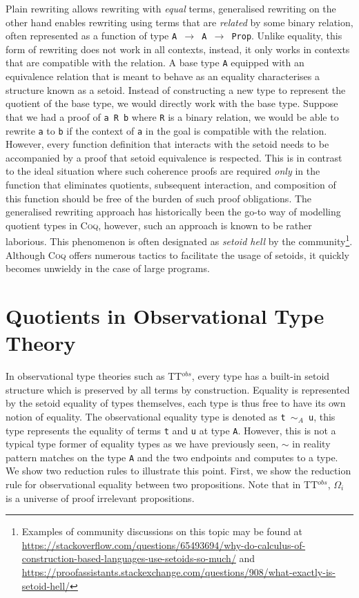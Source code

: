 \documentclass[12pt,twoside,maitrise]{dms}
\theoremstyle{definition}
\numberwithin{equation}{section}
\numberwithin{table}{chapter}
\numberwithin{figure}{chapter}
\newcommand\kw[1] {\textsf{#1}}
\newcommand\id[1] {\texttt{#1}}
\newcommand\fn[1] {\texttt{#1}}
\def\Coq{\textsc{Coq}\xspace}
\begin{document}
Plain rewriting allows rewriting with \emph{equal} terms, generalised
rewriting\cite{sozeau2009new, coq-gen-rewriting} on the other hand enables
rewriting using terms that are \emph{related} by some binary relation, often
represented as a function of type \fn{A $\rightarrow$ A $\rightarrow$
  \kw{Prop}}. Unlike equality, this form of rewriting does not work in all
contexts, instead, it only works in contexts that are compatible with the
relation. A base type \id{A} equipped with an equivalence relation that is meant
to behave as an equality characterises a structure known as a
setoid\cite{hofmann1995simple}. Instead of constructing a new type to represent
the quotient of the base type, we would directly work with the base type.
Suppose that we had a proof of \fn{a R b} where \id{R} is a binary relation, we
would be able to rewrite \id{a} to \id{b} if the context of \id{a} in the goal
is compatible with the relation. However, every function definition that
interacts with the setoid needs to be accompanied by a proof that setoid
equivalence is respected. This is in contrast to the ideal situation where such
coherence proofs are required \emph{only} in the function that eliminates
quotients, subsequent interaction, and composition of this function should be
free of the burden of such proof obligations. The generalised rewriting approach
has historically been the go-to way of modelling quotient types in \Coq{},
however, such an approach is known to be rather laborious. This phenomenon is
often designated as \emph{setoid hell} by the community\footnote{Examples of
community discussions on this topic may be found at
\url{https://stackoverflow.com/questions/65493694/why-do-calculus-of-construction-based-languages-use-setoids-so-much/}
and
\url{https://proofassistants.stackexchange.com/questions/908/what-exactly-is-setoid-hell/}}.
Although \Coq{} offers numerous tactics to facilitate the usage of setoids, it
quickly becomes unwieldy in the case of large programs.

\section{Quotients in Observational Type Theory}


In observational type theories such as TT$^{obs}$\cite{pujet2022observational},
every type has a built-in setoid structure which is preserved by all terms by
construction. Equality is represented by the setoid equality of types
themselves, each type is thus free to have its own notion of equality. The
observational equality type is denoted as \fn{t $\sim_A$ u}, this type
represents the equality of terms \id{t} and \id{u} at type \id{A}. However, this
is not a typical type former of equality types as we have previously seen,
$\sim$ in reality pattern matches on the type \id{A} and the two endpoints and
computes to a type. We show two reduction rules to illustrate this point. First,
we show the reduction rule for observational equality between two propositions.
Note that in TT$^{obs}$, $\Omega_i$ is a universe of proof irrelevant
propositions.
\end{document}
